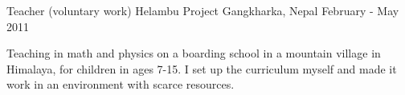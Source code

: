 \begin{cventries}
\cventry
{Teacher (voluntary work)} %
{Helambu Project} %
{Gangkharka, Nepal} %
{February - May 2011} %
{ %
\begin{cvitems}
\item {Teaching in math and physics on a boarding school in a mountain village in Himalaya, for children in ages 7-15. 
		I set up the curriculum myself and made it work in an environment with scarce resources.
}
\end{cvitems}
}

\end{cventries}